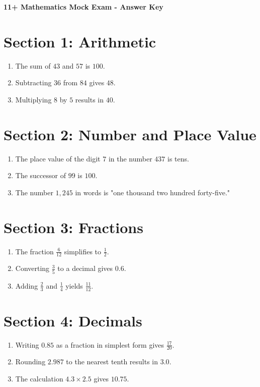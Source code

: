 \documentclass[12pt]{article}
\begin{document}
\begin{center}
\textbf{11+ Mathematics Mock Exam - Answer Key}
\end{center}

\section*{Section 1: Arithmetic}
\begin{enumerate}
  \item The sum of $43$ and $57$ is $100$.
  \item Subtracting $36$ from $84$ gives $48$.
  \item Multiplying $8$ by $5$ results in $40$.
\end{enumerate}

\section*{Section 2: Number and Place Value}
\begin{enumerate}
  \item The place value of the digit $7$ in the number $437$ is tens.
  \item The successor of $99$ is $100$.
  \item The number $1,245$ in words is "one thousand two hundred forty-five."
\end{enumerate}

\section*{Section 3: Fractions}
\begin{enumerate}
  \item The fraction $\frac{6}{12}$ simplifies to $\frac{1}{2}$.
  \item Converting $\frac{3}{5}$ to a decimal gives $0.6$.
  \item Adding $\frac{2}{3}$ and $\frac{1}{4}$ yields $\frac{11}{12}$.
\end{enumerate}

\section*{Section 4: Decimals}
\begin{enumerate}
  \item Writing $0.85$ as a fraction in simplest form gives $\frac{17}{20}$.
  \item Rounding $2.987$ to the nearest tenth results in $3.0$.
  \item The calculation $4.3 \times 2.5$ gives $10.75$.
\end{enumerate}
\end{document}
